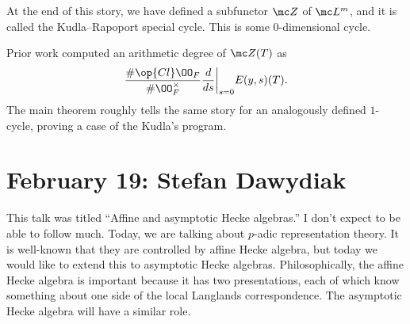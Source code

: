\documentclass{article}
\begin{document}
At the end of this story, we have defined a subfunctor $\mc Z$ of $\mc L^m$, and it is called the Kudla--Rapoport special cycle. This is some $0$-dimensional cycle.
\begin{remark}
	Prior work computed an arithmetic degree of $\mc Z(T)$ as
	\[\frac{\#\op{Cl}\OO_F}{\#\OO_F^\times}\frac d{ds}\bigg|_{s=0}E(y,s)(T).\]
	The main theorem roughly tells the same story for an analogously defined $1$-cycle, proving a case of the Kudla's program.
\end{remark}

\section{February 19: Stefan Dawydiak}
This talk was titled ``Affine and asymptotic Hecke algebras.'' I don't expect to be able to follow much. Today, we are talking about $p$-adic representation theory. It is well-known that they are controlled by affine Hecke algebra, but today we would like to extend this to asymptotic Hecke algebras. Philosophically, the affine Hecke algebra is important because it has two presentations, each of which know something about one side of the local Langlands correspondence. The asymptotic Hecke algebra will have a similar role.
\end{document}
